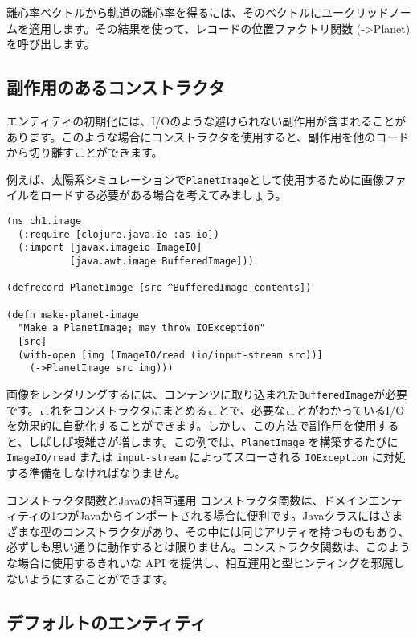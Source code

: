 離心率ベクトルから軌道の離心率を得るには、そのベクトルにユークリッドノームを適用します。その結果を使って、レコードの位置ファクトリ関数 (->Planet) を呼び出します。

\subsection{副作用のあるコンストラクタ}

エンティティの初期化には、I/Oのような避けられない副作用が含まれることがあります。このような場合にコンストラクタを使用すると、副作用を他のコードから切り離すことができます。

例えば、太陽系シミュレーションで\texttt{PlanetImage}として使用するために画像ファイルをロードする必要がある場合を考えてみましょう。


\begin{lstlisting}[numbers=none]
(ns ch1.image
  (:require [clojure.java.io :as io])
  (:import [javax.imageio ImageIO]
           [java.awt.image BufferedImage]))

(defrecord PlanetImage [src ^BufferedImage contents])

(defn make-planet-image
  "Make a PlanetImage; may throw IOException"
  [src]
  (with-open [img (ImageIO/read (io/input-stream src))]
    (->PlanetImage src img)))
\end{lstlisting}

画像をレンダリングするには、コンテンツに取り込まれた\texttt{BufferedImage}が必要です。これをコンストラクタにまとめることで、必要なことがわかっているI/Oを効果的に自動化することができます。しかし、この方法で副作用を使用すると、しばしば複雑さが増します。この例では、\texttt{PlanetImage} を構築するたびに \texttt{ImageIO/read} または \texttt{input-stream} によってスローされる \texttt{IOException} に対処する準備をしなければなりません。

\begin{itembox}[l]{コンストラクタ関数とJavaの相互運用}
コンストラクタ関数は、ドメインエンティティの1つがJavaからインポートされる場合に便利です。Javaクラスにはさまざまな型のコンストラクタがあり、その中には同じアリティを持つものもあり、必ずしも思い通りに動作するとは限りません。コンストラクタ関数は、このような場合に使用するきれいな API を提供し、相互運用と型ヒンティングを邪魔しないようにすることができます。
\end{itembox}

\subsection{デフォルトのエンティティ}

